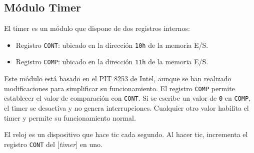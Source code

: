 \documentclass[12pt,oneside]{templates/unerthesis}
\providecommand{\tightlist}{%
  \setlength{\itemsep}{0pt}\setlength{\parskip}{0pt}}
\begin{document}
\hypertarget{muxf3dulo-timer}{%
\subsection{Módulo Timer}\label{muxf3dulo-timer}}

El timer es un módulo que dispone de dos registros internos:

\begin{itemize}
\tightlist
\item
  Registro \texttt{CONT}: ubicado en la dirección \texttt{10h} de la memoria E/S.
\item
  Registro \texttt{COMP}: ubicado en la dirección \texttt{11h} de la memoria E/S.
\end{itemize}

Este módulo está basado en el PIT 8253 de Intel, aunque se han realizado modificaciones para simplificar su funcionamiento. El registro \texttt{COMP} permite establecer el valor de comparación con \texttt{CONT}. Si se escribe un valor de \texttt{0} en \texttt{COMP}, el timer se desactiva y no genera interrupciones. Cualquier otro valor habilita el timer y permite su funcionamiento normal.

El reloj es un dispositivo que hace tic cada segundo. Al hacer tic, incrementa el registro \texttt{CONT} del {[}\emph{timer}{]} en uno.
\end{document}

